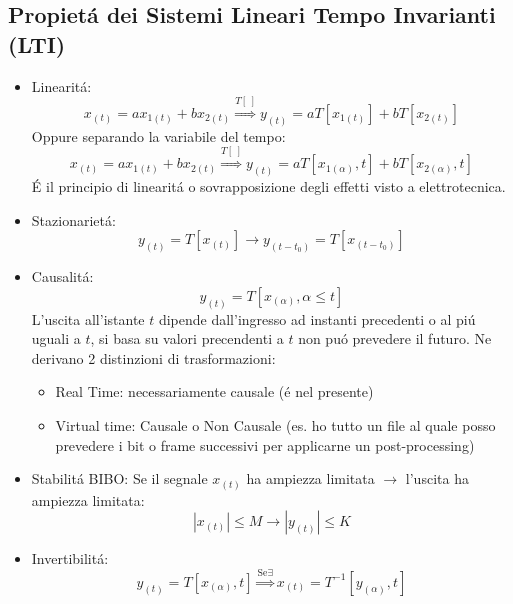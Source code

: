     \subsection{Propietá dei Sistemi Lineari Tempo Invarianti (LTI)}
        \begin{itemize}
            \item {Linearitá:
                \[
                    x_{(t)} = ax_{1(t)}+bx_{2(t)} \overset{T[\ ]}{\Rightarrow} y_{(t)} = aT[x_{1(t)}]+b T[x_{2(t)}]
                \]
                Oppure separando la variabile del tempo:
                \[
                    x_{(t)} = ax_{1(t)}+bx_{2(t)} \overset{T[\ ]}{\Rightarrow} y_{(t)} = aT[x_{1(\alpha)},t]+b T[x_{2(\alpha)},t]
                \]
                É il principio di linearitá o sovrapposizione degli effetti visto a elettrotecnica.
            }\label{SM Linearita}
            \item {Stazionarietá:
                \[
                    y_{(t)} = T[x_{(t)}] \rightarrow y_{(t-t_0)} = T[x_{(t-t_0)}]  
                \]
            }\label{SM Stazionarieta}
            \item {Causalitá:
                \[
                    y_{(t)} = T[x_{(\alpha)},\alpha\leq t]
                \]
                L'uscita all'istante $t$ dipende dall'ingresso ad instanti precedenti o al piú uguali a $t$, si basa su valori precendenti a 
                $t$ non puó prevedere il futuro. Ne derivano 2 distinzioni di trasformazioni:
                \begin{itemize}
                    \item Real Time: necessariamente causale (é nel presente)
                    \item Virtual time: Causale o Non Causale (es. ho tutto un file al quale posso prevedere i bit o frame successivi per applicarne un post-processing)
                \end{itemize}
            }\label{SM Causalita}
            \item {Stabilitá BIBO:
                Se il segnale $x_{(t)}$ ha ampiezza limitata $\rightarrow$ l'uscita ha ampiezza limitata:
                    \[
                        |x_{(t)}|\leq M \rightarrow |y_{(t)}|\leq K 
                    \]
            }\label{SM Stabilita BIBO}
            \item {Invertibilitá:
                \[
                    y_{(t)} = T[x_{(\alpha)},t] \overset{\text{Se} \exists}{\Rightarrow} x_{(t)} = T^{-1}[y_{(\alpha)},t]
                \]
            }\label{SM Invertibilita}

\end{itemize}
